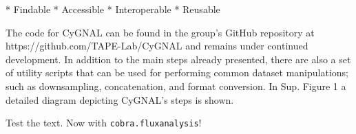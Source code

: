 * Findable
* Accessible
* Interoperable
* Reusable

The code for CyGNAL can be found in the group’s GitHub repository at  https://github.com/TAPE-Lab/CyGNAL and remains under continued development. In addition to the main steps already presented, there are also a set of utility scripts that can be used for performing common dataset manipulations; such as downsampling, concatenation, and format conversion. In Sup. Figure 1 a detailed diagram depicting CyGNAL’s steps is shown.


Test the text. Now with \texttt{cobra.flux\textunderscore analysis}!




